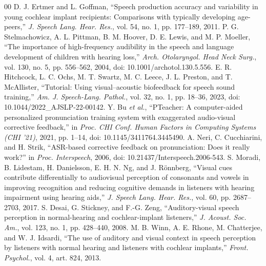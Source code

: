 \documentclass[conference]{IEEEtran}
\begin{document}
\begin{thebibliography}{00}
 D. J. Ertmer and L. Goffman, ``Speech production accuracy and variability in young cochlear implant recipients: Comparisons with typically developing age-peers,'' \textit{J. Speech Lang. Hear. Res.}, vol. 54, no. 1, pp. 177--189, 2011.
 P. G. Stelmachowicz, A. L. Pittman, B. M. Hoover, D. E. Lewis, and M. P. Moeller, ``The importance of high-frequency audibility in the speech and language development of children with hearing loss,'' \textit{Arch. Otolaryngol. Head Neck Surg.}, vol. 130, no. 5, pp. 556--562, 2004, doi: 10.1001/archotol.130.5.556.
 E. R. Hitchcock, L. C. Ochs, M. T. Swartz, M. C. Leece, J. L. Preston, and T. McAllister, ``Tutorial: Using visual--acoustic biofeedback for speech sound training,'' \textit{Am. J. Speech-Lang. Pathol.}, vol. 32, no. 1, pp. 18--36, 2023, doi: 10.1044/2022\_AJSLP-22-00142.
 Y. Bu \textit{et al.}, ``PTeacher: A computer-aided personalized pronunciation training system with exaggerated audio-visual corrective feedback,'' in \textit{Proc. CHI Conf. Human Factors in Computing Systems (CHI '21)}, 2021, pp. 1--14, doi: 10.1145/3411764.3445490.
 A. Neri, C. Cucchiarini, and H. Strik, ``ASR-based corrective feedback on pronunciation: Does it really work?'' in \textit{Proc. Interspeech}, 2006, doi: 10.21437/Interspeech.2006-543.
 S. Moradi, B. Lidestam, H. Danielsson, E. H. N. Ng, and J. R{\"o}nnberg, ``Visual cues contribute differentially to audiovisual perception of consonants and vowels in improving recognition and reducing cognitive demands in listeners with hearing impairment using hearing aids,'' \textit{J. Speech Lang. Hear. Res.}, vol. 60, pp. 2687--2703, 2017.
 S. Desai, G. Stickney, and F.-G. Zeng, ``Auditory-visual speech perception in normal-hearing and cochlear-implant listeners,'' \textit{J. Acoust. Soc. Am.}, vol. 123, no. 1, pp. 428--440, 2008.
 M. B. Winn, A. E. Rhone, M. Chatterjee, and W. J. Idsardi, ``The use of auditory and visual context in speech perception by listeners with normal hearing and listeners with cochlear implants,'' \textit{Front. Psychol.}, vol. 4, art. 824, 2013.

\end{thebibliography}
\end{document}
